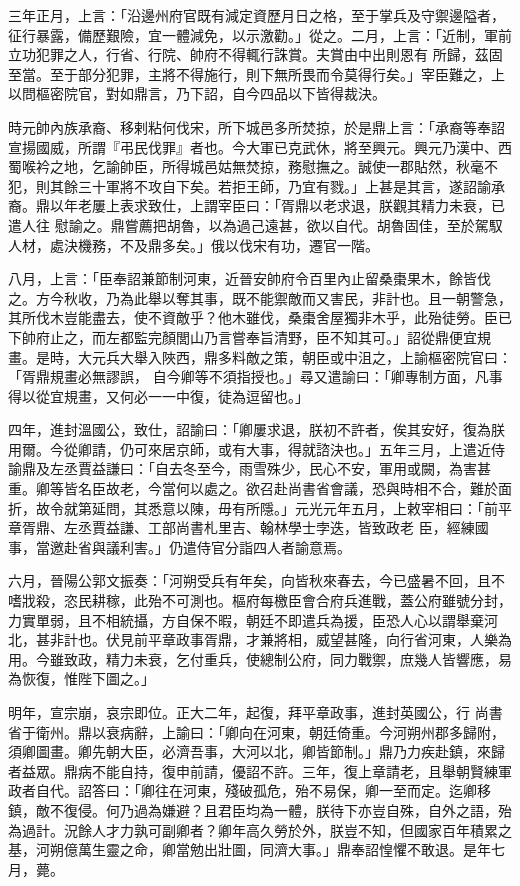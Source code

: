 \begin{pinyinscope}
 三年正月，上言：「沿邊州府官既有減定資歷月日之格，至于掌兵及守禦邊隘者，征行暴露，備歷艱險，宜一體減免，以示激勸。」從之。二月，上言：「近制，軍前立功犯罪之人，行省、行院、帥府不得輒行誅賞。夫賞由中出則恩有
 所歸，茲固至當。至于部分犯罪，主將不得施行，則下無所畏而令莫得行矣。」宰臣難之，上以問樞密院官，對如鼎言，乃下詔，自今四品以下皆得裁決。



 時元帥內族承裔、移剌粘何伐宋，所下城邑多所焚掠，於是鼎上言：「承裔等奉詔宣揚國威，所謂『弔民伐罪』者也。今大軍已克武休，將至興元。興元乃漢中、西蜀喉衿之地，乞諭帥臣，所得城邑姑無焚掠，務慰撫之。誠使一郡貼然，秋毫不犯，則其餘三十軍將不攻自下矣。若拒王師，乃宜有戮。」上甚是其言，遂詔諭承裔。鼎以年老屢上表求致仕，上謂宰臣曰：「胥鼎以老求退，朕觀其精力未衰，已遣人往
 慰諭之。鼎嘗薦把胡魯，以為過己遠甚，欲以自代。胡魯固佳，至於駕馭人材，處決機務，不及鼎多矣。」俄以伐宋有功，遷官一階。



 八月，上言：「臣奉詔兼節制河東，近晉安帥府令百里內止留桑棗果木，餘皆伐之。方今秋收，乃為此舉以奪其事，既不能禦敵而又害民，非計也。且一朝警急，其所伐木豈能盡去，使不資敵乎？他木雖伐，桑棗舍屋獨非木乎，此殆徒勞。臣已下帥府止之，而左都監完顏閭山乃言嘗奉旨清野，臣不知其可。」詔從鼎便宜規畫。是時，大元兵大舉入陜西，鼎多料敵之策，朝臣或中沮之，上諭樞密院官曰：「胥鼎規畫必無謬誤，
 自今卿等不須指授也。」尋又遣諭曰：「卿專制方面，凡事得以從宜規畫，又何必一一中復，徒為逗留也。」



 四年，進封溫國公，致仕，詔諭曰：「卿屢求退，朕初不許者，俟其安好，復為朕用爾。今從卿請，仍可來居京師，或有大事，得就諮決也。」五年三月，上遣近侍諭鼎及左丞賈益謙曰：「自去冬至今，雨雪殊少，民心不安，軍用或闕，為害甚重。卿等皆名臣故老，今當何以處之。欲召赴尚書省會議，恐與時相不合，難於面折，故令就第延問，其悉意以陳，毋有所隱。」元光元年五月，上敕宰相曰：「前平章胥鼎、左丞賈益謙、工部尚書札里吉、翰林學士孛迭，皆致政老
 臣，經練國事，當邀赴省與議利害。」仍遣侍官分詣四人者諭意焉。



 六月，晉陽公郭文振奏：「河朔受兵有年矣，向皆秋來春去，今已盛暑不回，且不嗜戕殺，恣民耕稼，此殆不可測也。樞府每檄臣會合府兵進戰，蓋公府雖號分封，力實單弱，且不相統攝，方自保不暇，朝廷不即遣兵為援，臣恐人心以謂舉棄河北，甚非計也。伏見前平章政事胥鼎，才兼將相，威望甚隆，向行省河東，人樂為用。今雖致政，精力未衰，乞付重兵，使總制公府，同力戰禦，庶幾人皆響應，易為恢復，惟陛下圖之。」



 明年，宣宗崩，哀宗即位。正大二年，起復，拜平章政事，進封英國公，行
 尚書省于衛州。鼎以衰病辭，上諭曰：「卿向在河東，朝廷倚重。今河朔州郡多歸附，須卿圖畫。卿先朝大臣，必濟吾事，大河以北，卿皆節制。」鼎乃力疾赴鎮，來歸者益眾。鼎病不能自持，復申前請，優詔不許。三年，復上章請老，且舉朝賢練軍政者自代。詔答曰：「卿往在河東，殘破孤危，殆不易保，卿一至而定。迄卿移鎮，敵不復侵。何乃過為嫌避？且君臣均為一體，朕待下亦豈自殊，自外之語，殆為過計。況餘人才力孰可副卿者？卿年高久勞於外，朕豈不知，但國家百年積累之基，河朔億萬生靈之命，卿當勉出壯圖，同濟大事。」鼎奉詔惶懼不敢退。是年七
 月，薨。




\end{pinyinscope}

